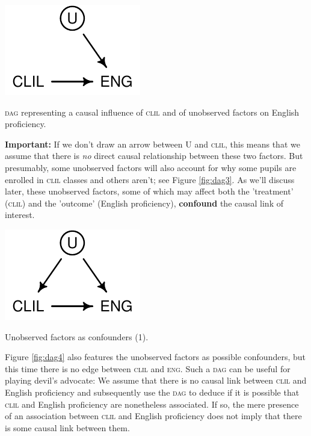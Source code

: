 \documentclass[a4paper]{tufte-book}\usepackage[]{graphicx}\usepackage[]{xcolor}
\newcommand{\term}[1]{\textbf{#1}}
\begin{document}
\begin{marginfigure}
  \centering
  \includegraphics{figure/dag-unobserved-1}
  \caption{\textsc{dag} representing a causal influence of \textsc{clil} and of unobserved factors on English proficiency.}
  \label{fig:dag2}
\end{marginfigure}


\textbf{Important:} If we don't draw an arrow between U and \textsc{clil}, this means
that we assume that there is \emph{no} direct causal relationship between these two factors.
But presumably, some unobserved factors will also account for why some pupils are
enrolled in \textsc{clil} classes and others aren't; see Figure \ref{fig:dag3}. As we'll discuss later,
these unobserved factors, some of which may affect both the 'treatment' (\textsc{clil})
and the 'outcome' (English proficiency), \term{confound} the causal link of interest.



\begin{marginfigure}
  \centering
  \includegraphics{figure/dag-confound-1}
  \caption{Unobserved factors as confounders (1).}
  \label{fig:dag3}
\end{marginfigure}

Figure \vref{fig:dag4} also features the unobserved factors as possible confounders,
but this time there is no edge between \textsc{clil} and \textsc{eng}.
Such a \textsc{dag} can be useful for playing devil's advocate:
We assume that there is no causal link between \textsc{clil} and English proficiency
and subsequently use the \textsc{dag} to deduce if it is possible that 
\textsc{clil} and English proficiency are nonetheless associated.
If so, the mere presence of an association between \textsc{clil} and English
proficiency does not imply that there is some causal link between them.
\end{document}

